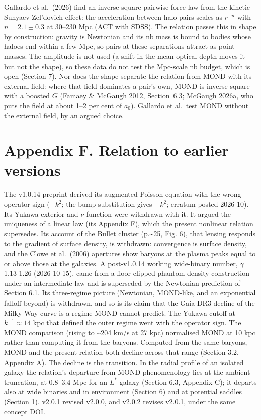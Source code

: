 \documentclass[
  10pt,
]{article}
\begin{document}
Gallardo et al.~(2026) find an inverse-square pairwise force law from the kinetic Sunyaev-Zel'dovich effect: the acceleration between halo pairs scales as $r^{-n}$ with $n=2.1\pm0.3$ at 30--230 Mpc (ACT with SDSS). The relation passes this
in shape by construction: gravity is Newtonian and its nb mass is bound to bodies whose haloes end within a few Mpc,
so pairs at these separations attract as point masses. The amplitude is not used (a shift in the mean optical depth moves it but not the shape), so these data do not test the Mpc-scale nb budget, which is open (Section 7). Nor does the shape separate the relation from MOND with its external field: where that field dominates a pair's own, MOND is inverse-square with a boosted $G$ (Famaey \& McGaugh 2012, Section~6.3; McGaugh 2026a, who puts the field at about 1--2 per cent of $a_0$). Gallardo et al.\ test MOND without the external field, by an argued choice.

\section{Appendix F. Relation to earlier versions}\label{appendix-f.-relation-to-v1.0.14}

The v1.0.14 preprint derived its augmented Poisson equation with the wrong operator sign ($-k^2$; the bump substitution gives $+k^2$; erratum posted 2026-10). Its Yukawa exterior and $\nu$-function were withdrawn with it. It argued the uniqueness of a linear law (its Appendix F), which the present nonlinear relation supersedes. Its account of the Bullet cluster (p.\textasciitilde{}25, Fig. 6), that lensing responds to the gradient of surface density, is withdrawn: convergence is surface density, and the Clowe et al.~(2006) apertures show baryons at the plasma peaks equal to or above those at the galaxies. A post-v1.0.14 working wide-binary number, $\gamma$ = 1.13-1.26 (2026-10-15), came from a floor-clipped phantom-density construction under an intermediate law and is superseded by the Newtonian prediction of Section 6.1. Its three-regime picture (Newtonian, MOND-like, and an exponential falloff beyond) is withdrawn, and so is its claim that the Gaia DR3 decline of the Milky Way curve is a regime MOND cannot predict. The Yukawa cutoff at $k^{-1}\approx14$ kpc that defined the outer regime went with the operator sign. The MOND comparison (rising to \textasciitilde{}204 km/s at 27 kpc) normalised MOND at 10 kpc rather than computing it from the baryons. Computed from the same baryons, MOND and the present relation both decline across that range (Section 3.2, Appendix A). The decline is the transition. In the radial profile of an isolated galaxy the relation's departure from MOND phenomenology lies at the ambient truncation, at 0.8--3.4 Mpc for an $L^*$ galaxy (Section 6.3, Appendix C); it departs also at wide binaries and in environment (Section 6) and at potential saddles (Section 1). v2.0.1 revised v2.0.0, and v2.0.2 revises v2.0.1, under the same concept DOI.
\end{document}
